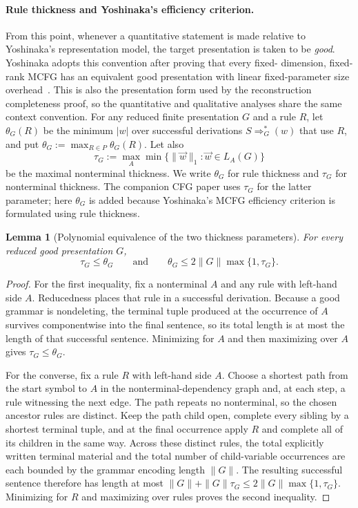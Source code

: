 \documentclass[11pt]{article}
\numberwithin{equation}{section}
\theoremstyle{plain}
\newtheorem{lemma}[theorem]{Lemma}
\theoremstyle{definition}
\theoremstyle{remark}
\newcommand{\tuple}[1]{\vec{#1}}
\begin{document}
\paragraph{Rule thickness and Yoshinaka's efficiency criterion.}
From this point, whenever a quantitative statement is made relative to
Yoshinaka's representation model, the target presentation is taken to be
\emph{good}.  Yoshinaka adopts this convention after proving that every fixed-
dimension, fixed-rank MCFG has an equivalent good presentation with linear
fixed-parameter size overhead~\cite[Section~2.3, immediately after Lemma~1]{Yoshinaka2011}.
This is also the presentation form used by the reconstruction completeness
proof, so the quantitative and qualitative analyses share the same context
convention.
For any reduced finite presentation $G$ and a rule $R$, let $\theta_G(R)$ be
the minimum $|w|$ over successful derivations $S\Rightarrow_G^*(w)$ that use
$R$, and put $\theta_G:=\max_{R\in P}\theta_G(R)$.  Let also
\[
 \tau_G:=\max_A\min\{\|\tuple w\|_1:\tuple w\in L_A(G)\}
\]
be the maximal nonterminal thickness.  We write $\theta_G$ for rule thickness and
$\tau_G$ for nonterminal thickness.  The companion CFG paper uses $\tau_G$ for
the latter parameter; here $\theta_G$ is added because Yoshinaka's MCFG
efficiency criterion is formulated using rule thickness.

\begin{lemma}[Polynomial equivalence of the two thickness parameters]
\label{lem:thickness-equivalence}
For every reduced good presentation $G$,
\[
  \tau_G\le\theta_G
  \qquad\text{and}\qquad
  \theta_G\le 2\|G\|\max\{1,\tau_G\}.
\]
\end{lemma}

\begin{proof}
For the first inequality, fix a nonterminal $A$ and any rule with left-hand
side $A$.  Reducedness places that rule in a successful derivation.  Because a
good grammar is nondeleting, the terminal tuple produced at the occurrence of
$A$ survives componentwise into the final sentence, so its total length is at
most the length of that successful sentence.  Minimizing for $A$ and then
maximizing over $A$ gives $\tau_G\le\theta_G$.

For the converse, fix a rule $R$ with left-hand side $A$.  Choose a shortest
path from the start symbol to $A$ in the nonterminal-dependency graph and, at
each step, a rule witnessing the next edge.  The path repeats no nonterminal,
so the chosen ancestor rules are distinct.  Keep the path child open, complete
every sibling by a shortest terminal tuple, and at the final occurrence apply
$R$ and complete all of its children in the same way.  Across these distinct
rules, the total explicitly written terminal material and the total number of
child-variable occurrences are each bounded by the grammar encoding length
$\|G\|$.  The resulting successful sentence therefore has length at most
$\|G\|+\|G\|\tau_G\le2\|G\|\max\{1,\tau_G\}$.  Minimizing for $R$ and
maximizing over rules proves the second inequality.
\end{proof}
\end{document}
